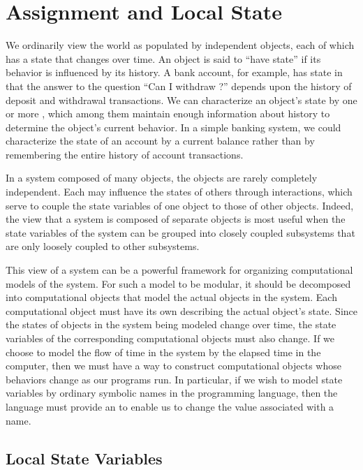 \section{Assignment and Local State}
\label{Section 3.1}

We ordinarily view the world as populated by independent objects, each of which has a state that changes over time.
An object is said to “have state” if its behavior is influenced by its history.
A bank account, for example, has state in that the answer to the question “Can I withdraw ?” depends upon the history of deposit and withdrawal transactions.
We can characterize an object’s state by one or more , which among them maintain enough information about history to determine the object’s current behavior.
In a simple banking system, we could characterize the state of an account by a current balance rather than by remembering the entire history of account transactions.

In a system composed of many objects, the objects are rarely completely independent.
Each may influence the states of others through interactions, which serve to couple the state variables of one object to those of other objects.
Indeed, the view that a system is composed of separate objects is most useful when the state variables of the system can be grouped into closely coupled subsystems that are only loosely coupled to other subsystems.

This view of a system can be a powerful framework for organizing computational models of the system.
For such a model to be modular, it should be decomposed into computational objects that model the actual objects in the system.
Each computational object must have its own  describing the actual object’s state.
Since the states of objects in the system being modeled change over time, the state variables of the corresponding computational objects must also change.
If we choose to model the flow of time in the system by the elapsed time in the computer, then we must have a way to construct computational objects whose behaviors change as our programs run.
In particular, if we wish to model state variables by ordinary symbolic names in the programming language, then the language must provide an  to enable us to change the value associated with a name.



\subsection{Local State Variables}
\label{Section 3.1.1}

